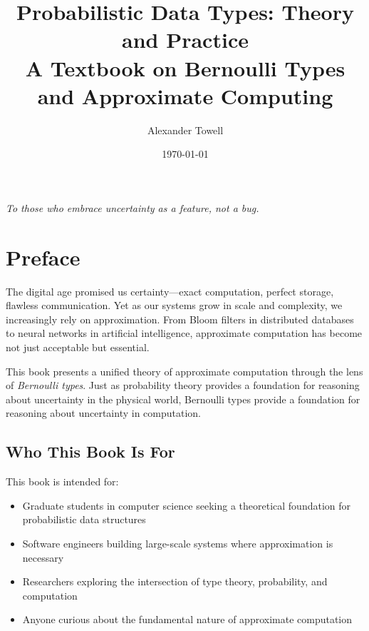 \documentclass[11pt,twoside,openright]{book}
\title{Probabilistic Data Types: Theory and Practice\\
\large A Textbook on Bernoulli Types and Approximate Computing}
\author{Alexander Towell}
\date{\today}
\theoremstyle{definition}
\theoremstyle{plain}
\theoremstyle{remark}
\begin{document}
\frontmatter

\maketitle

\clearpage
\thispagestyle{empty}

\vspace*{\fill}
\begin{center}
\textit{To those who embrace uncertainty as a feature, not a bug.}
\end{center}
\vspace*{\fill}

\clearpage

\tableofcontents
\listoffigures
\listoftables
\listofalgorithms

\chapter{Preface}

The digital age promised us certainty—exact computation, perfect storage, flawless communication. Yet as our systems grow in scale and complexity, we increasingly rely on approximation. From Bloom filters in distributed databases to neural networks in artificial intelligence, approximate computation has become not just acceptable but essential.

This book presents a unified theory of approximate computation through the lens of \emph{Bernoulli types}. Just as probability theory provides a foundation for reasoning about uncertainty in the physical world, Bernoulli types provide a foundation for reasoning about uncertainty in computation.

\section*{Who This Book Is For}

This book is intended for:
\begin{itemize}
    \item Graduate students in computer science seeking a theoretical foundation for probabilistic data structures
    \item Software engineers building large-scale systems where approximation is necessary
    \item Researchers exploring the intersection of type theory, probability, and computation
    \item Anyone curious about the fundamental nature of approximate computation
\end{itemize}
\end{document}
